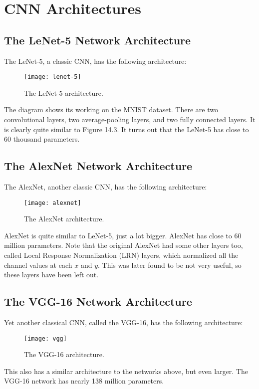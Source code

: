 \documentclass[a4paper, 12pt]{report}
\begin{document}
\chapter{CNN Architectures}

\section{The LeNet-5 Network Architecture}
The LeNet-5, a classic CNN, has the following architecture:
\begin{figure}[H]
\centering
\texttt{[image: lenet-5]}
\caption{The LeNet-5 architecture.}
\end{figure}
The diagram shows its working on the MNIST dataset. There are two convolutional layers, two average-pooling layers, and two fully connected layers. It is clearly quite similar to Figure 14.3. It turns out that the LeNet-5 has close to 60 thousand parameters.

\section{The AlexNet Network Architecture}
The AlexNet, another classic CNN, has the following architecture:
\begin{figure}[H]
\centering
\texttt{[image: alexnet]}
\caption{The AlexNet architecture.}
\end{figure}
AlexNet is quite similar to LeNet-5, just a lot bigger. AlexNet has close to 60 million parameters. Note that the original AlexNet had some other layers too, called Local Response Normalization (LRN) layers, which normalized all the channel values at each $x$ and $y$. This was later found to be not very useful, so these layers have been left out.

\section{The VGG-16 Network Architecture}
Yet another classical CNN, called the VGG-16, has the following architecture:
\begin{figure}[H]
\centering
\texttt{[image: vgg]}
\caption{The VGG-16 architecture.}
\end{figure}
This also has a similar architecture to the networks above, but even larger. The VGG-16 network has nearly 138 million parameters.
\end{document}

